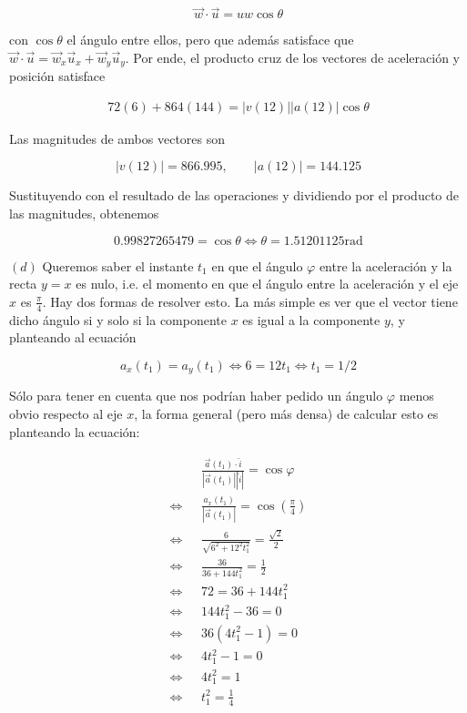 \documentclass[12pt]{article}
\theoremstyle{definition}
\begin{document}
\begin{equation*}
    \vec{w} \cdot \vec{u} = uw \cos \theta
\end{equation*}

con $\cos \theta$ el ángulo entre ellos, pero que además satisface que 
$\vec{w} \cdot \vec{u} = \vec{w}_x \vec{u}_x + \vec{w}_y \vec{u}_y$. Por ende,
el producto cruz de los vectores de aceleración y posición satisface 

\begin{align*}
    72(6) + 864(144) = \left| v(12) \right| \left| a(12) \right|
    \cos \theta
\end{align*}

Las magnitudes de ambos vectores son 

\begin{equation*}
    \left| v(12) \right| = 866.995, \qquad \left| a(12)
    \right| = 144.125
\end{equation*}

Sustituyendo con el resultado de las operaciones y dividiendo por el producto de
las magnitudes, obtenemos

\begin{equation*}
    0.99827265479 = \cos \theta \iff \theta = 1.51201125\text{rad}
\end{equation*}

$(d)$ Queremos saber el instante $t_1$ en que el ángulo $\varphi$ entre la
aceleración y la recta $y = x$ es nulo, i.e. el momento en que el ángulo entre
la aceleración y el eje $x$ es $\frac{\pi}{4}$. Hay dos formas de resolver esto.
La más simple es ver que el vector tiene dicho ángulo si y solo si la componente
$x$ es igual a la componente $y$, y planteando al ecuación 

\begin{equation*}
    a_x(t_1) = a_y(t_1) \iff 6 = 12t_1 \iff t_1 = 1 / 2
\end{equation*}

Sólo para tener en cuenta que nos podrían haber pedido un ángulo $\varphi$ menos
obvio respecto al eje $x$, la forma general (pero más densa) de calcular esto
es planteando la ecuación:

\begin{align*}
    &\frac{ \vec{a}(t_1) \cdot \hat{i} }{\left| \vec{a}(t_1) \right| \left|
    \hat{i} \right| } = \cos \varphi \\
    \iff ~ ~ ~ 
    &\frac{a_x(t_1)}{\left| \vec{a}(t_1)
\right| } = \cos(\frac{\pi}{4}) \\ 
\iff ~ ~ ~ 
    &\frac{6}{\sqrt{6^2 + 12^2t_1^2} } = 
\frac{ \sqrt{2}  }{2} \\ 
\iff ~ ~ ~ 
    &\frac{ 36 }{36 + 144t_1^2} = \frac{1}{2}\\ 
    \iff ~ ~ ~ 
    &72 = 36 + 144t_1^2\\
    \iff ~ ~ ~ 
    &144t_1^2 -36 = 0 \\ 
    \iff ~ ~ ~ 
    &36\left( 4t_1^2 - 1 \right) =0 \\ 
    \iff ~ ~ ~ 
    &4t_1^2 - 1 = 0\\
    \iff ~ ~ ~ 
    &4t_1^2 = 1\\
    \iff ~ ~ ~ 
    &t_1^2 = \frac{1}{4}
\end{align*}
\end{document}

